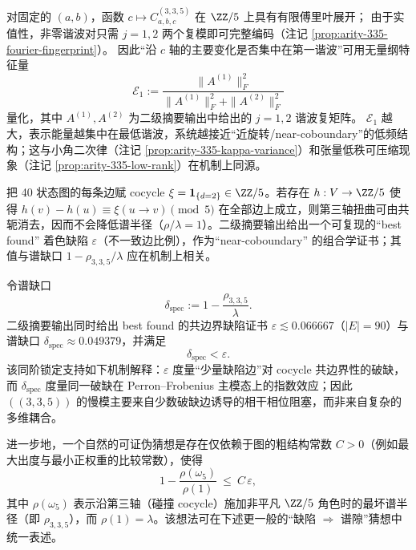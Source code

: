 

\begin{remark}\label{rem:arity-335-harmonic-energy}
对固定的 \((a,b)\)，函数 \(c\mapsto C^{(3,3,5)}_{a,b,c}\) 在 \(\ZZ/5\) 上具有有限傅里叶展开；
由于实值性，非零谐波对只需 \(j=1,2\) 两个复模即可完整编码（注记 \ref{prop:arity-335-fourier-fingerprint}）。
因此“沿 \(c\) 轴的主要变化是否集中在第一谐波”可用无量纲特征量
$$
\mathcal{E}_1
:=\frac{\|A^{(1)}\|_F^2}{\|A^{(1)}\|_F^2+\|A^{(2)}\|_F^2}
$$
量化，其中 \(A^{(1)},A^{(2)}\) 为二级摘要输出中给出的 \(j=1,2\) 谐波复矩阵。
\(\mathcal{E}_1\) 越大，表示能量越集中在最低谐波，系统越接近“近旋转/near-coboundary”的低频结构；这与小角二次律（注记 \ref{prop:arity-335-kappa-variance}）和张量低秩可压缩现象（注记 \ref{prop:arity-335-low-rank}）在机制上同源。
\end{remark}

\begin{remark}\label{rem:arity-335-best-5-coloring}
把 40 状态图的每条边赋 cocycle $\xi=\mathbf{1}_{\{d=2\}}\in\ZZ/5$。若存在 $h:V\to\ZZ/5$ 使得 $h(v)-h(u)\equiv \xi(u\to v)\pmod 5$ 在全部边上成立，则第三轴扭曲可由共轭消去，因而不会降低谱半径（$\rho/\lambda=1$）。二级摘要输出给出一个可复现的“best found” 着色缺陷 $\varepsilon$（不一致边比例），作为“near-coboundary” 的组合学证书；其值与谱缺口 $1-\rho_{3,3,5}/\lambda$ 应在机制上相关。
\end{remark}

\begin{remark}[近共边界缺陷的组合测度与谱测度同阶]\label{rem:arity-335-eps-vs-gap}
令谱缺口
$$
\delta_{\mathrm{spec}}:=1-\frac{\rho_{3,3,5}}{\lambda}.
$$
二级摘要输出同时给出 best found 的共边界缺陷证书 \(\varepsilon\lesssim 0.066667\)（\(|E|=90\)）与谱缺口
\(
\delta_{\mathrm{spec}}\approx 0.049379
\)，并满足
$$
\delta_{\mathrm{spec}}<\varepsilon.
$$
该同阶锁定支持如下机制解释：\(\varepsilon\) 度量“少量缺陷边”对 cocycle 共边界性的破缺，而 \(\delta_{\mathrm{spec}}\) 度量同一破缺在 Perron--Frobenius 主模态上的指数效应；因此 \(((3,3,5))\) 的慢模主要来自少数破缺边诱导的相干相位阻塞，而非来自复杂的多维耦合。

进一步地，一个自然的可证伪猜想是存在仅依赖于图的粗结构常数 \(C>0\)（例如最大出度与最小正权重的比较常数），使得
$$
1-\frac{\rho(\omega_5)}{\rho(1)}\ \le\ C\,\varepsilon,
$$
其中 \(\rho(\omega_5)\) 表示沿第三轴（碰撞 cocycle）施加非平凡 \(\ZZ/5\) 角色时的最坏谱半径（即 \(\rho_{3,3,5}\)），而 \(\rho(1)=\lambda\)。该想法可在下述更一般的“缺陷 $\Rightarrow$ 谱隙”猜想中统一表述。
\end{remark}

